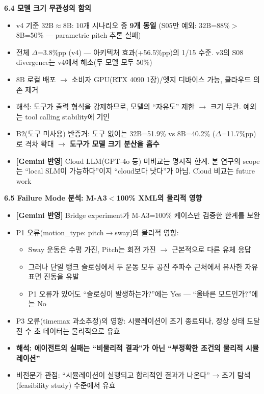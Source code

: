 \documentclass[11pt,a4paper]{article}
\begin{document}
\textbf{6.4 모델 크기 무관성의 함의}
\begin{itemize}[nosep,leftmargin=1.5em]
\item v4 기준 32B$\approx$8B: 10개 시나리오 중 \textbf{9개 동일} (S05만 예외: 32B=88\%$>$8B=50\% --- parametric pitch 추론 실패)
\item 전체 $\Delta$=3.8\%pp (v4) --- 아키텍처 효과(+56.5\%pp)의 1/15 수준. v3의 S08 divergence는 v4에서 해소(두 모델 모두 50\%)
\item 8B 로컬 배포 $\rightarrow$ 소비자 GPU(RTX 4090 1장)/엣지 디바이스 가능, 클라우드 의존 제거
\item 해석: 도구가 출력 형식을 강제하므로, 모델의 ``자유도'' 제한 $\rightarrow$ 크기 무관. 예외는 tool calling stability에 기인
\item B2(도구 미사용) 반증거: 도구 없이는 32B=51.9\% vs 8B=40.2\% ($\Delta$=11.7\%pp)로 격차 확대 $\rightarrow$ \textbf{도구가 모델 크기 분산을 흡수}
\item {\color{red}\textbf{[Gemini 반영]}} Cloud LLM(GPT-4o 등) 미비교는 명시적 한계. 본 연구의 scope는 ``local SLM이 가능하다''이지 ``cloud보다 낫다''가 아님. Cloud 비교는 future work
\end{itemize}

\textbf{6.5 Failure Mode 분석: M-A3$<$100\% XML의 물리적 영향}
\begin{itemize}[nosep,leftmargin=1.5em]
\item {\color{red}\textbf{[Gemini 반영]}} Bridge experiment가 M-A3=100\% 케이스만 검증한 한계를 보완
\item P1 오류(motion\_type: pitch$\rightarrow$sway)의 물리적 영향:
  \begin{itemize}[nosep,leftmargin=1em]
  \item Sway 운동은 수평 가진, Pitch는 회전 가진 $\rightarrow$ 근본적으로 다른 유체 응답
  \item 그러나 단일 탱크 슬로싱에서 두 운동 모두 공진 주파수 근처에서 유사한 자유표면 진동을 유발
  \item P1 오류가 있어도 ``슬로싱이 발생하는가?''에는 Yes --- ``올바른 모드인가?''에는 No
  \end{itemize}
\item P3 오류(timemax 과소추정)의 영향: 시뮬레이션이 조기 종료되나, 정상 상태 도달 전 수 초 데이터는 물리적으로 유효
\item \textbf{해석: 에이전트의 실패는 ``비물리적 결과''가 아닌 ``부정확한 조건의 물리적 시뮬레이션''}
\item 비전문가 관점: ``시뮬레이션이 실행되고 합리적인 결과가 나온다'' → 초기 탐색(feasibility study) 수준에서 유효
\end{itemize}
\end{document}
